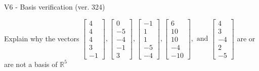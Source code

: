 \begin{exercise}
  \begin{exerciseTitle}V6 - Basis verification (ver. 324)\end{exerciseTitle}
  \begin{exerciseStatement}
    Explain why the vectors \(\left[\begin{array}{r}
4 \\
4 \\
4 \\
3 \\
-1
\end{array}\right] , \left[\begin{array}{r}
0 \\
-5 \\
-4 \\
-1 \\
3
\end{array}\right] , \left[\begin{array}{r}
-1 \\
1 \\
1 \\
-5 \\
-4
\end{array}\right] , \left[\begin{array}{r}
6 \\
10 \\
10 \\
-4 \\
-10
\end{array}\right] , \text{ and } \left[\begin{array}{r}
4 \\
3 \\
-4 \\
2 \\
-5
\end{array}\right]\) are or are not a basis of \(\mathbb{R}^5\)	



\end{exerciseStatement}
\end{exercise}
